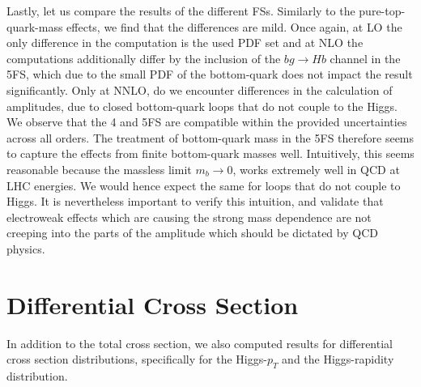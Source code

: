 Lastly, let us compare the results of the different \acs{FS}s. Similarly to the pure-top-quark-mass effects, we find that the differences are mild. Once again, at \acs{LO} the only difference in the computation is the used \acs{PDF} set and at \acs{NLO} the computations additionally differ by the inclusion of the $b g \longrightarrow Hb$ channel in the 5\acs{FS}, which due to the small \acs{PDF} of the bottom-quark does not impact the result significantly. Only at \acs{NNLO}, do we encounter differences in the calculation of amplitudes, due to closed bottom-quark loops that do not couple to the Higgs. We observe that the 4 and 5\acs{FS} are compatible within the provided uncertainties across all orders. The treatment of bottom-quark mass in the 5\acs{FS} therefore seems to capture the effects from finite bottom-quark masses well. Intuitively, this seems reasonable because the massless limit $m_b \rightarrow 0$, works extremely well in \acs{QCD} at \acs{LHC} energies. We would hence expect the same for loops that do not couple to Higgs. It is nevertheless important to verify this intuition, and validate that electroweak effects which are causing the strong mass dependence are not creeping into the parts of the amplitude which should be dictated by \acs{QCD} physics.

\section{Differential Cross Section}
In addition to the total cross section, we also computed results for differential cross section distributions, specifically for the Higgs-$p_T$ and the Higgs-rapidity distribution.

